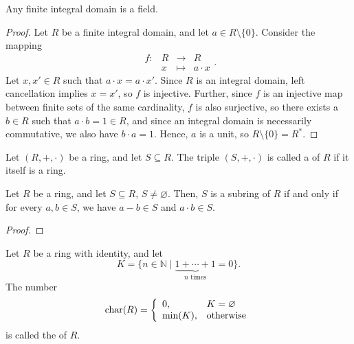 \begin{thm}
Any finite integral domain is a field.
\end{thm}
\begin{proof}
Let $ R $ be a finite integral domain, and let $ a\in R\setminus\{0\} $. Consider the mapping
\begin{equation*}
    \begin{array}{rccc}
        f: & R & \to & R \\
        & x & \mapsto & a\cdot x
    \end{array}.
\end{equation*}
Let $ x,x'\in R $ such that $ a\cdot x=a\cdot x' $. Since $ R $ is an integral domain, left cancellation implies $ x=x' $, so $ f $ is injective. Further, since $ f $ is an injective map between finite sets of the same cardinality, $ f $ is also surjective, so there exists a $ b\in R $ such that $ a\cdot b=1\in R $, and since an integral domain is necessarily commutative, we also have $ b\cdot a=1 $. Hence, $ a $ is a unit, so $ R\setminus\{0\}=R^* $.
\end{proof}

\begin{defn}
Let $ (R,+,\cdot) $ be a ring, and let $ S\subseteq R $. The triple $ (S,+,\cdot) $ is called a  of $ R $ if it itself is a ring.
\end{defn}

\begin{thm}
Let $ R $ be a ring, and let $ S\subseteq R $, $ S\neq\varnothing $. Then, $ S $ is a subring of $ R $ if and only if for every $ a,b\in S $, we have $ a-b\in S $ and $ a\cdot b\in S $.
\end{thm}
\begin{proof}
\end{proof}

\begin{defn}
Let $ R $ be a ring with identity, and let
\begin{equation*}
    K=\{n\in\mathbb{N}\mid\underbrace{1+\cdots+1}_{n\text{ times}}=0\}.
\end{equation*}
The number
\begin{equation*}
    \operatorname{char}(R)=
    \left\{\begin{array}{ll}
        0, & K=\varnothing \\
        \min(K), & \text{otherwise}
    \end{array}\right.
\end{equation*}
is called the  of $ R $.
\end{defn}

